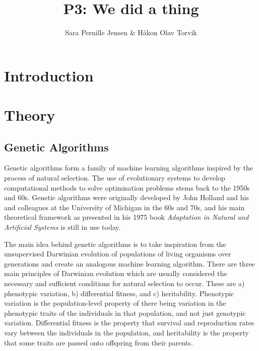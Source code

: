 \documentclass[multicolumn, 12pt]{extarticle}
\author{\Large Sara Pernille Jensen \& Håkon Olav Torvik}
\title{\Huge P3: We did a thing}
\affiliation{\large FYS-STK4155 – Applied Data Analysis and Machine Learning
\\Autumn 2021\\Department of Physics\\University of Oslo\\\\\today}
\begin{document}


\maketitle

\pagestyle{myplain}


\twocolumn
\section{Introduction}


\section{Theory}

\subsection{Genetic Algorithms}
Genetic algorithms form a family of machine learning algorithms inspired by the process of natural selection. The use of evolutionary systems to develop computational methods to solve optimisation problems stems back to the 1950s and 60s. Genetic algorithms were originally developed by John Holland and his and colleagues at the University of Michigan in the 60s and 70s, and his main theoretical framework as presented in his 1975 book \textit{Adaptation in Natural and Artificial Systems} \cite{Holland XXX} is still in use today. 

The main idea behind genetic algorithms is to take inspiration from the unsupervised Darwinian evolution of populations of living organisms over generations and create an analogous machine learning algorithm. There are three main principles of Darwinian evolution which are usually considered the necessary and sufficient conditions for natural selection to occur. These are a) phenotypic variation, b) differential fitness, and c) heritability. Phenotypic variation is the population-level property of there being variation in the phenotypic traits of the individuals in that population, and not just genotypic variation. Differential fitness is the property that survival and reproduction rates vary between the individuals in the population, and heritability is the property that some traits are passed onto offspring from their parents. 
\end{document}
